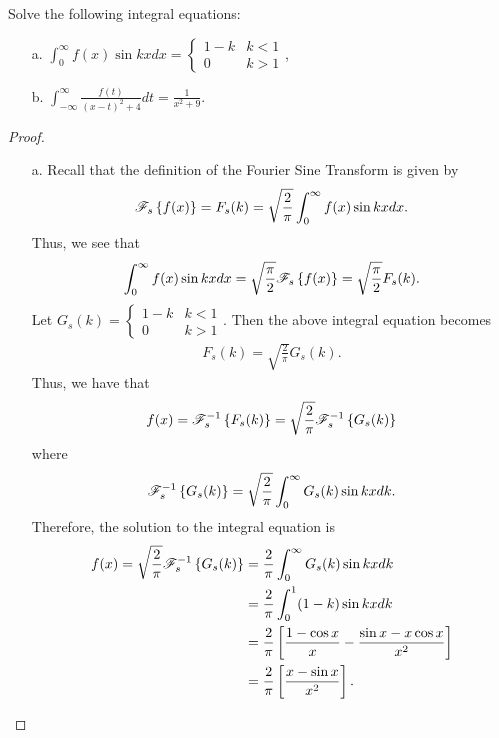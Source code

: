 \begin{problem}{3}
  Solve the following integral equations:
  \begin{enumerate}
    \item[a.] $\displaystyle \int_0^\infty f(x) \sin kx dx = \begin{cases} 1-k & k<1 \\ 0 & k > 1\end{cases}$,
    \item[b.] $\displaystyle \int_{-\infty}^\infty \frac{f(t)}{(x-t)^2 + 4}dt = \frac{1}{x^2+9}$.
  \end{enumerate}
\end{problem}

\begin{proof}
  \begin{enumerate}
    \item[a.] Recall that the definition of the Fourier Sine Transform is given by
      \begin{align*}
        \mathscr{F}_s\left\{ {f(x)} \right\} = F_s(k) = \sqrt{\frac{2}{\pi}}\int_{0}^\infty f(x) \sin kx dx.
      \end{align*}
      Thus, we see that
      \begin{align*}
        \int_0^\infty f(x) \sin kx dx = \sqrt{\frac{\pi}{2}} \mathscr{F}_s\left\{ {f(x)} \right\} = \sqrt{\frac{\pi}{2}} F_s(k).
      \end{align*}
      Let $\displaystyle G_s(k) = \begin{cases} 1-k & k<1 \\ 0 & k > 1\end{cases}$. Then the above integral equation becomes
      \begin{align*}
        F_s(k) = \sqrt{\frac{2}{\pi}}G_s(k).
      \end{align*}
      Thus, we have that
      \begin{align*}
        f(x) = \mathscr{F}_s^{-1}\left\{ {F_s(k)} \right\} = \sqrt{\frac{2}{\pi}}\mathscr{F}_s^{-1}\left\{ {G_s(k)} \right\}
      \end{align*}
      where
      \begin{align*}
        \mathscr{F}_s^{-1}\left\{ {G_s(k)} \right\} = \sqrt{\frac{2}{\pi}}\int_0^\infty G_s(k)\sin kx dk.
      \end{align*}
      Therefore, the solution to the integral equation is
      \begin{align*}
        f(x) = \sqrt{\frac{2}{\pi}}\mathscr{F}_s^{-1}\left\{ {G_s(k)} \right\} &= \frac{2}{\pi}\int_0^\infty G_s(k)\sin kx dk \\
        &= \frac{2}{\pi} \int_0^1 (1-k)\sin kx dk \\
        &= \frac{2}{\pi} \left[\frac{1-\cos x}{x} - \frac{\sin x - x \cos x}{x^2}\right] \\
        &= \frac{2}{\pi}\left[\frac{x - \sin x}{x^2}\right].
      \end{align*}


\end{enumerate}
\end{proof}
